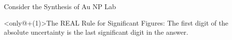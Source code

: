 \documentclass[notes=hide]{beamer}
\begin{document}
\begin{frame}[t]{Consider the Synthesis of Au NP Lab}
	\begin{block}<only@+(1)>{The \alert{REAL} Rule for Significant Figures:}
		The first digit of the absolute uncertainty is the last
		significant digit in the answer.
	\end{block}
\end{frame}

%
%
%
%
%
%
%
%
\end{document}
